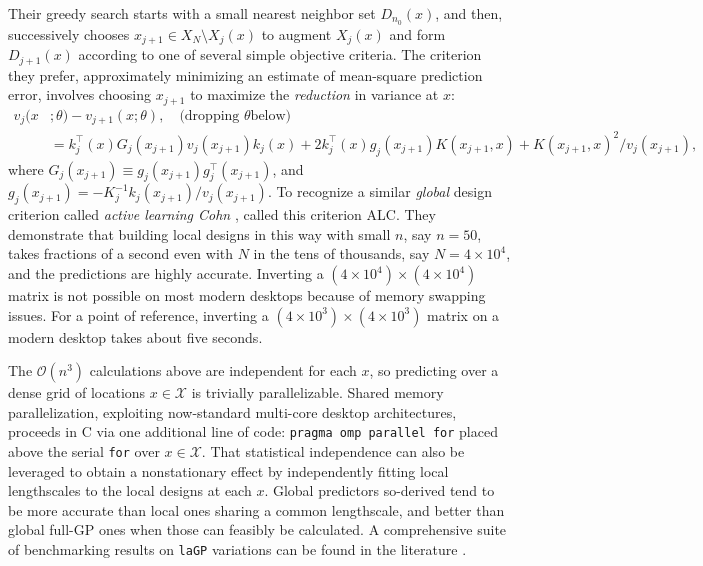 \documentclass[12pt]{article}
\begin{document}
Their greedy search starts with a small nearest neighbor set $D_{n_0}(x)$, and
then, successively chooses $x_{j+1} \in X_N \setminus X_j(x)$ to
augment $X_j(x)$ and form $D_{j+1}(x)$ according to one of several simple
objective criteria. The criterion they prefer, approximately minimizing an
estimate of mean-square prediction error, involves choosing $x_{j+1}$ to
maximize the {\em reduction} in variance at $x$:
\begin{align}
 v_j(x&; \theta)  - v_{j+1}(x; \theta), \quad \mbox{(dropping $\theta$
below)} \label{eq:dxy} \\ 
&= k_j^\top(x) G_j(x_{j+1}) v_j(x_{j+1}) k_j(x) +
2k_j^\top(x) g_j(x_{j+1}) K(x_{j+1},x) + K(x_{j+1},x)^2 / v_j(x_{j+1}),
\nonumber
\end{align}
where $G_j(x_{j+1}) \equiv g_j(x_{j+1}) g_j^\top(x_{j+1})$, and $g_j(x_{j+1}) = -K_j^{-1}
k_j(x_{j+1})/v_j(x_{j+1})$. 
To recognize a similar {\em global} design criterion called {\em active
learning Cohn} \citep{cohn:1996}, \citeauthor{gramacy:apley:2015} called
this criterion ALC. They demonstrate that building local designs in this way
with small $n$, say $n=50$, takes fractions of a second even with $N$ in the
tens of thousands, say $N=4\times 10^4$, and the predictions are highly accurate.
Inverting a $(4 \times 10^4)
\times (4 \times 10^4)$ matrix is not possible on most modern desktops because of memory
swapping issues.  For a point of reference, inverting a $(4 \times 10^3)
\times (4 \times 10^3)$
matrix on a modern desktop takes about five seconds.  

The $\mathcal{O}(n^3)$ calculations above are independent for each $x$, so
predicting over a dense grid of locations $x \in \mathcal{X}$ is trivially
parallelizable. Shared memory parallelization, exploiting now-standard
multi-core desktop architectures, proceeds in {\sf C} via one additional line
of code: \verb!pragma omp parallel for! placed above the serial {\tt for} over
$x \in \mathcal{X}$.  That statistical independence can also be leveraged to
obtain a nonstationary effect by independently fitting local lengthscales to
the local designs at each $x$.  Global predictors so-derived tend to be more
accurate than local ones sharing a common lengthscale, and better than global
full-GP ones when those can feasibly be calculated.  A comprehensive suite of
benchmarking results on {\tt laGP} variations can be found in the literature
\citep[e.g.,][]{gramacy:apley:2015,gramacy:niemi:weiss:2014,gramacy:haaland:2015,gramacy:jss:2016}.
\end{document}

